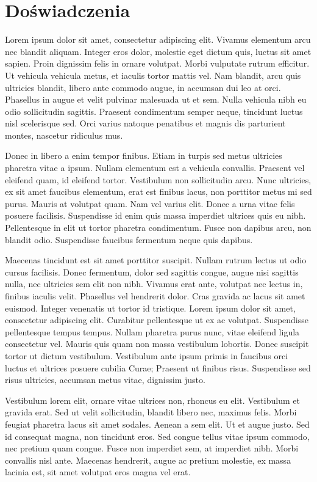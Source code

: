 \chapter{Doświadczenia} 
Lorem ipsum dolor sit amet, consectetur adipiscing elit. Vivamus elementum arcu nec blandit aliquam. Integer eros dolor, molestie eget dictum quis, luctus sit amet sapien. Proin dignissim felis in ornare volutpat. Morbi vulputate rutrum efficitur. Ut vehicula vehicula metus, et iaculis tortor mattis vel. Nam blandit, arcu quis ultricies blandit, libero ante commodo augue, in accumsan dui leo at orci. Phasellus in augue et velit pulvinar malesuada ut et sem. Nulla vehicula nibh eu odio sollicitudin sagittis. Praesent condimentum semper neque, tincidunt luctus nisl scelerisque sed. Orci varius natoque penatibus et magnis dis parturient montes, nascetur ridiculus mus.

Donec in libero a enim tempor finibus. Etiam in turpis sed metus ultricies pharetra vitae a ipsum. Nullam elementum est a vehicula convallis. Praesent vel eleifend quam, id eleifend tortor. Vestibulum non sollicitudin arcu. Nunc ultricies, ex sit amet faucibus elementum, erat est finibus lacus, non porttitor metus mi sed purus. Mauris at volutpat quam. Nam vel varius elit. Donec a urna vitae felis posuere facilisis. Suspendisse id enim quis massa imperdiet ultrices quis eu nibh. Pellentesque in elit ut tortor pharetra condimentum. Fusce non dapibus arcu, non blandit odio. Suspendisse faucibus fermentum neque quis dapibus.

Maecenas tincidunt est sit amet porttitor suscipit. Nullam rutrum lectus ut odio cursus facilisis. Donec fermentum, dolor sed sagittis congue, augue nisi sagittis nulla, nec ultricies sem elit non nibh. Vivamus erat ante, volutpat nec lectus in, finibus iaculis velit. Phasellus vel hendrerit dolor. Cras gravida ac lacus sit amet euismod. Integer venenatis ut tortor id tristique. Lorem ipsum dolor sit amet, consectetur adipiscing elit. Curabitur pellentesque ut ex ac volutpat. Suspendisse pellentesque tempus tempus. Nullam pharetra purus nunc, vitae eleifend ligula consectetur vel. Mauris quis quam non massa vestibulum lobortis. Donec suscipit tortor ut dictum vestibulum. Vestibulum ante ipsum primis in faucibus orci luctus et ultrices posuere cubilia Curae; Praesent ut finibus risus. Suspendisse sed risus ultricies, accumsan metus vitae, dignissim justo.

Vestibulum lorem elit, ornare vitae ultrices non, rhoncus eu elit. Vestibulum et gravida erat. Sed ut velit sollicitudin, blandit libero nec, maximus felis. Morbi feugiat pharetra lacus sit amet sodales. Aenean a sem elit. Ut et augue justo. Sed id consequat magna, non tincidunt eros. Sed congue tellus vitae ipsum commodo, nec pretium quam congue. Fusce non imperdiet sem, at imperdiet nibh. Morbi convallis nisl ante. Maecenas hendrerit, augue ac pretium molestie, ex massa lacinia est, sit amet volutpat eros magna vel erat.

